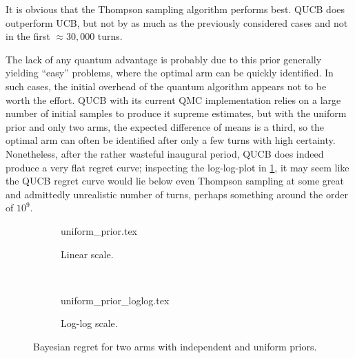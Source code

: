 It is obvious that the Thompson sampling algorithm performs best.
QUCB does outperform UCB, but not by as much as the previously considered cases and not in the first $\approx 30,000$ turns.

The lack of any quantum advantage is probably due to this prior generally yielding \enquote{easy} problems, where the optimal arm can be quickly identified.
In such cases, the initial overhead of the quantum algorithm appears not to be worth the effort.
QUCB with its current QMC implementation relies on a large number of initial samples to produce it supreme estimates, but with the uniform prior and only two arms, the expected difference of means is a third, so the optimal arm can often be identified after only a few turns with high certainty.
Nonetheless, after the rather wasteful inaugural period, QUCB does indeed produce a very flat regret curve; inspecting the log-log-plot in \cref{fig:random}, it may seem like the QUCB regret curve would lie below even Thompson sampling at some great and admittedly unrealistic number of turns, perhaps something around the order of $10^{9}$.



\begin{figure}
    \centering
    \begin{subfigure}{\textwidth}
        \centering
        \newcommand{\myoptions}{
            width=10cm,
            height=8cm,
            xlabel={Kiloturn},
            ylabel={Regret},
            legend entries={Baseline, UCB, QUCB, Thompson},
            legend pos=north west,
            legend cell align=left,
            mystyle,
            ymax = 150,
        }
        {uniform_prior.tex}
        \caption{Linear scale.}
    \end{subfigure}
    \\[3ex]
    \begin{subfigure}{\textwidth}
        \centering
        \newcommand{\myoptions}{
            width=10cm,
            height=8cm,
            xlabel={Turn},
            ylabel={Regret},
            legend entries={Baseline, UCB, QUCB, Thompson},
            legend pos=north west,
            legend cell align=left,
            mystyle,
        }
        {uniform_prior_loglog.tex}
        \caption{Log-log scale.}
    \end{subfigure}
    \caption[
        Bayesian regret for two Bernoulli arms, uniform prior.
    ]
    {
        Bayesian regret for two arms with independent and uniform priors.
    }
    \label{fig:random}
\end{figure}

